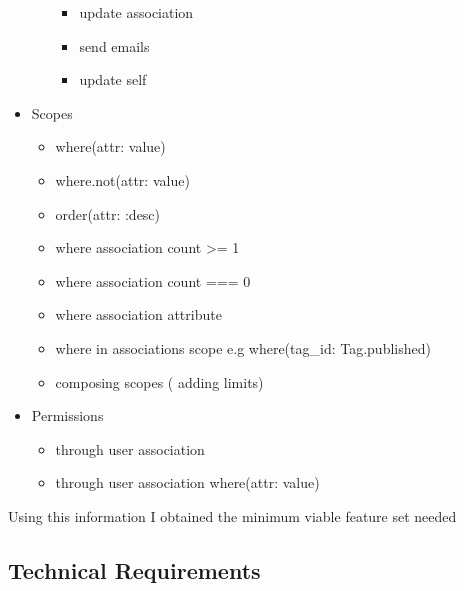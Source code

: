\documentclass[
  12pt,
]{article}
\providecommand{\tightlist}{%
  \setlength{\itemsep}{0pt}\setlength{\parskip}{0pt}}
\begin{document}
\begin{itemize}
\begin{itemize}
    \begin{itemize}
    \tightlist
    \item
      update association
    \item
      send emails
    \item
      update self
    \end{itemize}
  \end{itemize}
\item
  Scopes

  \begin{itemize}
  \tightlist
  \item
    where(attr: value)
  \item
    where.not(attr: value)
  \item
    order(attr: :desc)
  \item
    where association count \textgreater= 1
  \item
    where association count === 0
  \item
    where association attribute
  \item
    where in associations scope e.g where(tag\_id: Tag.published)
  \item
    composing scopes ( adding limits)
  \end{itemize}
\item
  Permissions

  \begin{itemize}
  \tightlist
  \item
    through user association
  \item
    through user association \textbar{} where(attr: value)
  \end{itemize}
\end{itemize}

Using this information I obtained the minimum viable feature set needed

\hypertarget{technical-requirements}{%
\subsection{Technical Requirements}\label{technical-requirements}}
\end{document}
